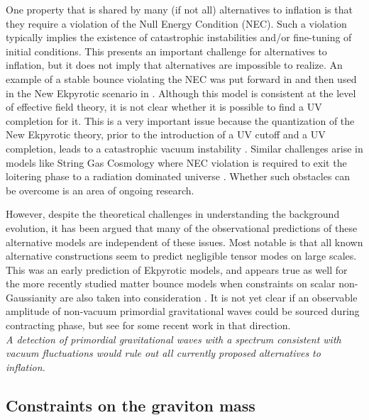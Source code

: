 One property that is shared by many (if not all) alternatives to inflation is that they require a violation of the Null Energy Condition (NEC). 
Such a violation typically implies the existence of catastrophic instabilities and/or fine-tuning of initial conditions.
This presents an important challenge for alternatives to inflation, but it does not imply that alternatives are impossible to realize. 
An example of a stable bounce violating the NEC was put forward in \cite{Creminelli:2006xe} and then
used in the New Ekpyrotic scenario in
\cite{Buchbinder:2007ad,Creminelli:2007aq}. Although this model is consistent at the level of effective field theory, it is not clear whether it is possible to find a UV completion for it. 
This is a very important issue because the quantization of the New Ekpyrotic theory, prior to the introduction of a UV cutoff and a UV completion, leads to a catastrophic vacuum instability \cite{Kallosh:2007ad}.  Similar challenges arise in models like String Gas Cosmology where NEC violation is required to exit the loitering phase to a radiation dominated universe
\cite{Brustein:1994kw,Kaloper:1995ey,Kaloper:1995tu,Kaloper:2007pw}.  Whether such obstacles can be overcome is an area of ongoing research.

However, despite the theoretical challenges in understanding the background evolution, it has been argued that many 
of the observational predictions of these alternative models are independent of these issues.
Most notable is that all known alternative constructions seem to predict negligible tensor modes on large scales.
This was an early prediction of Ekpyrotic models, and appears true as well for the more recently 
studied matter bounce models when constraints on scalar non-Gaussianity are also taken into consideration \cite{Quintin:2015rta}. It is not yet clear if an observable amplitude of non-vacuum primordial gravitational waves could be sourced during contracting phase, but see \cite{Ben-Dayan:2016iks} for some recent work in that direction. \\

{\it A detection of primordial gravitational waves with a spectrum consistent with vacuum fluctuations would rule out all currently proposed alternatives to inflation.}

\subsection{Constraints on the graviton mass}

